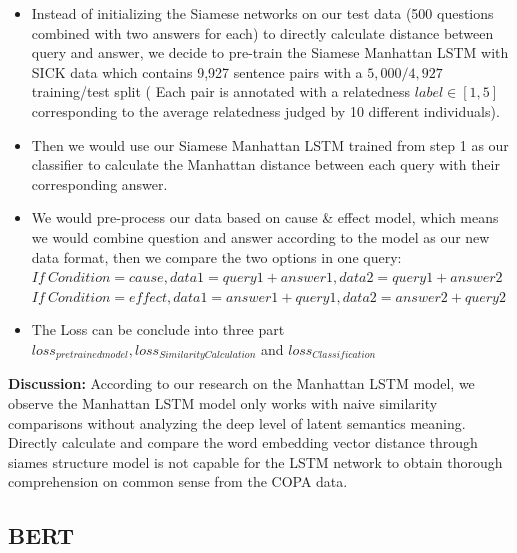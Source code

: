 \documentclass{article}
\begin{document}
\begin{itemize}
    \item Instead of initializing the Siamese networks on our test data (500 questions combined with two answers for each) to directly calculate distance between query and answer, we decide to pre-train the Siamese Manhattan LSTM with SICK data which contains 9,927 sentence pairs with a $5,000/4,927$ training/test split ( Each pair is annotated with a relatedness $label \in [1, 5]$ corresponding to the average relatedness judged by 10 different individuals).
    \item Then we would use our Siamese Manhattan LSTM trained from step 1 as our classifier to calculate the Manhattan distance between each query with their corresponding answer.
    \item We would pre-process our data based on cause & effect model, which means we would combine question and answer according to the model as our new data format, then we compare the two options in one query: \\
     $If \ Condition = cause,data1 = query1 + answer1, data2 = query1 + answer 2$ \\
    $If \ Condition = effect, data1 = answer1 + query1, data2 = answer2 + query2$
    \item The Loss can be conclude into three part $loss_{pretrained model}, 
    loss_{SimilarityCalculation}$ and $loss_{Classification}$
\end{itemize}

\textbf{Discussion:} According to our research on the Manhattan LSTM model, we observe the Manhattan LSTM model only works with naive similarity comparisons without analyzing the deep level of latent semantics meaning. Directly calculate and compare the word embedding vector distance through siames structure model is not capable for the LSTM network to obtain thorough comprehension on common sense from the COPA data.


\subsection{BERT}
\end{document}
